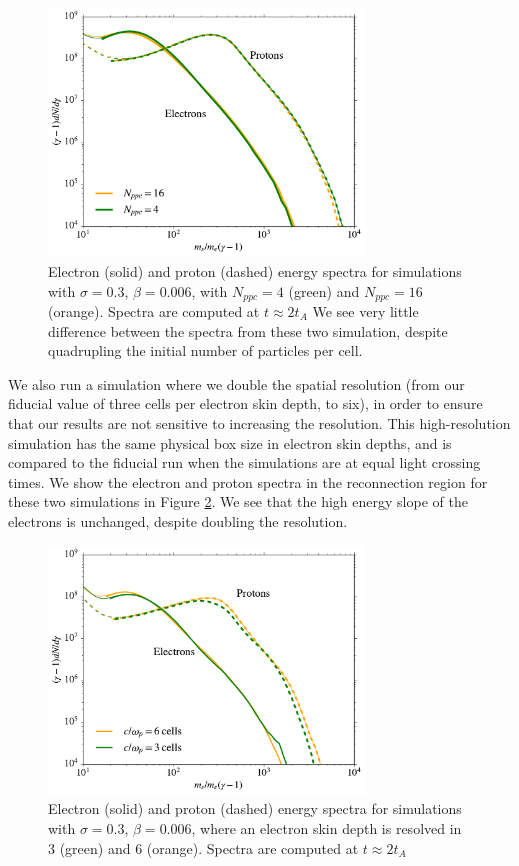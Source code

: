 \begin{figure}[!h]
\centering
\includegraphics[width =0.75\textwidth]{ppc_final.pdf}
\caption{Electron (solid) and proton (dashed) energy spectra for simulations with $\sigma=0.3$, $\beta=0.006$, with $N_{ppc}=4$ (green) and $N_{ppc}=16$ (orange).  Spectra are computed at $t\approx 2t_{A}$  We see very little difference between the spectra from these two simulation, despite quadrupling the initial number of particles per cell.}
\label{ppc_spect}
\end{figure}

We also run a simulation where we double the spatial resolution (from our fiducial value of three cells per electron skin depth, to six), in order to ensure that our results are not sensitive to increasing the resolution.  This high-resolution simulation has the same physical box size in electron skin depths, and is compared to the fiducial run when the simulations are at equal light crossing times.  We show the electron and proton spectra in the reconnection region for these two simulations in Figure \ref{comp_spect}.  We see that the high energy slope of the electrons is unchanged, despite doubling the resolution.

\begin{figure}[!h]
\centering
\includegraphics[width =0.75\textwidth]{comp_final.pdf}
\caption{Electron (solid) and proton (dashed) energy spectra for simulations with $\sigma=0.3$, $\beta=0.006$, where an electron skin depth is resolved in 3 (green) and 6 (orange).  Spectra are computed at $t\approx 2t_{A}$  }
\label{comp_spect}
\end{figure}


